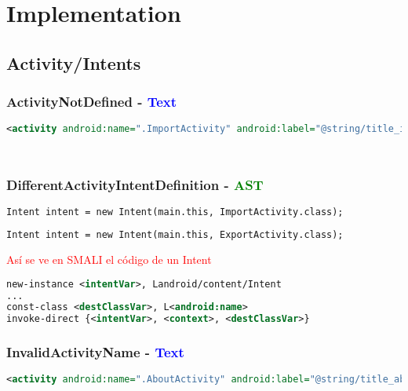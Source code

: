 
\chapter{Implementation} %

\label{ChapterX} %


\section{Activity/Intents}
\subsection{ActivityNotDefined - \textcolor{blue}{Text}}
\begin{lstlisting}[language=XML]
<activity android:name=".ImportActivity" android:label="@string/title_import" />
\end{lstlisting}
 \begin{lstlisting}[language=XML]
 
\end{lstlisting}


\subsection{DifferentActivityIntentDefinition - \textcolor{green}{AST}}
\begin{lstlisting}[language=XML]
Intent intent = new Intent(main.this, ImportActivity.class);
\end{lstlisting}
\begin{lstlisting}[language=XML]
Intent intent = new Intent(main.this, ExportActivity.class); 
\end{lstlisting}
\textcolor{red}{Así se ve en SMALI el código de un Intent}
\begin{lstlisting}[language=XML]
new-instance <intentVar>, Landroid/content/Intent
...
const-class <destClassVar>, L<android:name>
invoke-direct {<intentVar>, <context>, <destClassVar>}
\end{lstlisting}
\subsection{InvalidActivityName - \textcolor{blue}{Text}}
\begin{lstlisting}[language=XML]
<activity android:name=".AboutActivity" android:label="@string/title_about" /> 
\end{lstlisting}

